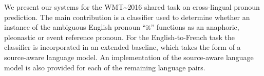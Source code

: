 We present our systems for the WMT{\textasciitilde}2016 shared task on cross-lingual pronoun prediction. The main contribution is a classifier used to determine whether an instance of the ambiguous English pronoun ``it'' functions as an anaphoric, pleonastic or event reference pronoun. For the English-to-French task the classifier is incorporated in an extended baseline, which takes the form of a source-aware language model. An implementation of the source-aware language model is also provided for each of the remaining language pairs.
